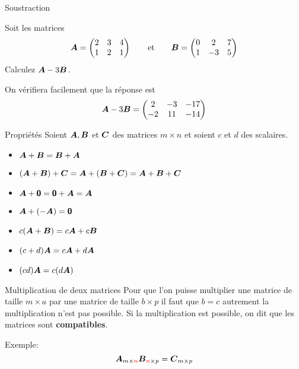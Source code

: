 \documentclass[french]{beamer}
\begin{document}
\begin{frame}{Soustraction}
\begin{example}
    Soit les matrices
    \[
    \boldsymbol{A} = \begin{pmatrix}
        2 & 3 & 4 \\
        1 & 2 & 1
        \end{pmatrix}
    \qquad \mbox{et} \qquad
    \boldsymbol{B} = \begin{pmatrix}
        0 & 2 & 7 \\
        1 & -3 & 5
        \end{pmatrix}
    \]
    Calculez $\boldsymbol{A}-3\boldsymbol{B}$.
\end{example}
    On vérifiera facilement que la réponse est
    \[
    \boldsymbol{A} - 3\boldsymbol{B} = \begin{pmatrix}
            2 & -3 & -17 \\
            -2 & 11 & -14
            \end{pmatrix}
    \]
\end{frame}

\begin{frame}{Propriétés}
Soient $\boldsymbol{A}, \boldsymbol{B}$ et $\boldsymbol{C}$ des matrices $m\times n$ et soient $c$ et $d$ des
scalaires.
\begin{itemize}
\item $\boldsymbol{A} + \boldsymbol{B} = \boldsymbol{B} + \boldsymbol{A}$
\item $(\boldsymbol{A} + \boldsymbol{B}) + \boldsymbol{C} = \boldsymbol{A} + (\boldsymbol{B} + \boldsymbol{C}) = \boldsymbol{A} + \boldsymbol{B} + \boldsymbol{C}$
\item $\boldsymbol{A} + \mbox{\textsf{\textbf{{0}}}} = \mbox{\textsf{\textbf{{0}}}} + \boldsymbol{A} = \boldsymbol{A}$
\item $\boldsymbol{A} + (-\boldsymbol{A}) = \mbox{\textsf{\textbf{{0}}}}$
\item $c(\boldsymbol{A}+\boldsymbol{B}) = c\boldsymbol{A} + c\boldsymbol{B}$
\item $(c+d) \boldsymbol{A} = c\boldsymbol{A} + d\boldsymbol{A}$
\item $(cd) \boldsymbol{A} = c (d\boldsymbol{A})$
\end{itemize}

\end{frame}


\begin{frame}{Multiplication de deux matrices}
Pour que l'on puisse multiplier une matrice de taille $m\times a$ 
par une matrice
de taille $b\times p$
 il faut que $b=c$ autrement la multiplication n'est pas possible.  
Si la multiplication est possible, on dit que les matrices sont \textbf{compatibles}.

Exemple:\huge
\[
\boldsymbol{A}_{m\times \textcolor{red}{n}} \boldsymbol{B}_{\textcolor{red}{n}\times p} = \boldsymbol{C}_{m\times p}
\]
\end{frame}
\end{document}
